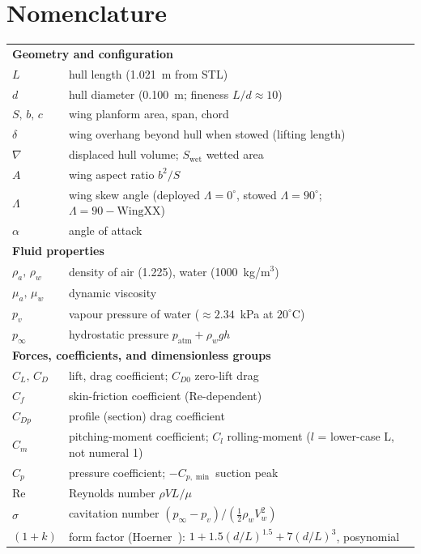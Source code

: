 \documentclass{new-aiaa}
\begin{document}
\section*{Nomenclature}
\noindent\begin{longtable}{@{}l p{10cm}@{}}
\multicolumn{2}{l}{\textbf{Geometry and configuration}}\\
$L$      & hull length (1.021~m from STL) \\
$d$      & hull diameter (0.100~m; fineness $L/d\approx 10$) \\
$S,\,b,\,c$ & wing planform area, span, chord \\
$\delta$ & wing overhang beyond hull when stowed (lifting length) \\
$\nabla$ & displaced hull volume; $S_{\text{wet}}$ wetted area \\
$A$      & wing aspect ratio $b^2/S$ \\
$\Lambda$& wing skew angle (deployed $\Lambda=0^\circ$, stowed $\Lambda=90^\circ$; $\Lambda=90-\text{WingXX}$) \\
$\alpha$ & angle of attack \\
\multicolumn{2}{l}{\textbf{Fluid properties}}\\
$\rho_a,\,\rho_w$ & density of air (1.225), water (1000~kg/m$^3$) \\
$\mu_a,\,\mu_w$ & dynamic viscosity \\
$p_v$    & vapour pressure of water ($\approx2.34$~kPa at $20^\circ$C)\cite{brennen2014cavitation} \\
$p_\infty$& hydrostatic pressure $p_{\text{atm}}+\rho_w g h$ \\
\multicolumn{2}{l}{\textbf{Forces, coefficients, and dimensionless groups}}\\
$C_L,\,C_D$ & lift, drag coefficient; $C_{D0}$ zero-lift drag \\
$C_f$    & skin-friction coefficient ($\text{Re}$-dependent) \\
$C_{Dp}$ & profile (section) drag coefficient \\
$C_m$    & pitching-moment coefficient; $C_l$ rolling-moment ($l$ = lower-case L, not numeral 1) \\
$C_p$    & pressure coefficient; $-C_{p,\min}$ suction peak \\
$\mathrm{Re}$& Reynolds number $\rho V L/\mu$ \\
$\sigma$ & cavitation number $(p_\infty-p_v)/(\tfrac12\rho_w V_w^2)$ \\
$(1+k)$ & form factor (Hoerner~\cite{hoerner1965fluid}): $1+1.5(d/L)^{1.5}+7(d/L)^3$, posynomial \\

\end{longtable}
\end{document}
